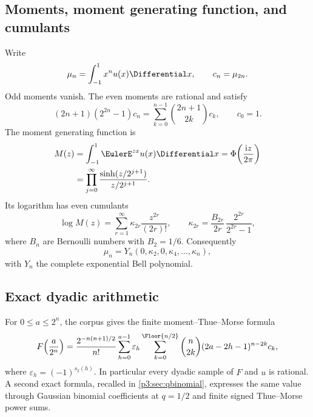 \documentclass[11pt,oneside]{article}
\numberwithin{equation}{section}
\theoremstyle{definition}
\theoremstyle{remark}
\newcommand{\eps}{\varepsilon}
\begin{document}
\subsection{Moments, moment generating function, and cumulants}

Write
\begin{equation}
 \mu_n=\int_{-1}^{1}x^n u(x)\Differential x,
 \qquad c_n=\mu_{2n}.
 \label{p3:eq:moments}
\end{equation}
Odd moments vanish.  The even moments are rational and satisfy
\begin{equation}
 (2n+1)(2^{2n}-1)c_n
 =\sum_{k=0}^{n-1}\binom{2n+1}{2k}c_k,
 \qquad c_0=1.
 \label{p3:eq:moment-recurrence}
\end{equation}
The moment generating function is
\begin{align}
 M(z)
 &=\int_{-1}^{1}\EulerE^{zx}u(x)\Differential x
 =\Phi\!\left(\frac{\iu z}{2\pi}\right)\notag\\
 &=\prod_{j=0}^{\infty}
 \frac{\sinh(z/2^{j+1})}{z/2^{j+1}}.
 \label{p3:eq:mgf-product}
\end{align}
Its logarithm has even cumulants
\begin{equation}
 \log M(z)=\sum_{r=1}^{\infty}\kappa_{2r}\frac{z^{2r}}{(2r)!},
 \qquad
 \boxed{\displaystyle
 \kappa_{2r}=\frac{B_{2r}}{2r}\,
 \frac{2^{2r}}{2^{2r}-1}},
 \label{p3:eq:cumulants}
\end{equation}
where $B_n$ are Bernoulli numbers with $B_2=1/6$.  Consequently
\begin{equation}
 \mu_n=Y_n(0,\kappa_2,0,\kappa_4,\ldots,\kappa_n),
 \label{p3:eq:moment-Bell}
\end{equation}
with $Y_n$ the complete exponential Bell polynomial.

\subsection{Exact dyadic arithmetic}

For $0\le a\le2^n$, the corpus gives the finite moment--Thue--Morse formula
\begin{equation}
 F\!\left(\frac a{2^n}\right)
 =\frac{2^{-n(n+1)/2}}{n!}
 \sum_{h=0}^{a-1}\eps_h
 \sum_{k=0}^{\Floor{n/2}}
 \binom n{2k}(2a-2h-1)^{n-2k}c_k,
 \label{p3:eq:finite-F-moment}
\end{equation}
where $\eps_h=(-1)^{s_2(h)}$.  In particular every dyadic sample of $F$ and $u$ is rational.  A second exact formula, recalled in \cref{p3:sec:qbinomial}, expresses the same value through Gaussian binomial coefficients at $q=1/2$ and finite signed Thue--Morse power sums.
\end{document}
